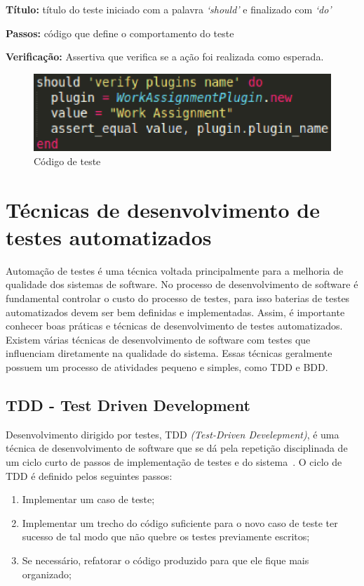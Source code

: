 \textbf{Título:} título do teste iniciado com a palavra \textit{‘should’} e finalizado com \textit{‘do’}

\textbf{Passos:} código que define o comportamento do teste

\textbf{Verificação:} Assertiva que verifica se a ação foi realizada como esperada.

\begin{figure}[!h]
    \centering
    \includegraphics[keepaspectratio=true,scale=0.55]
      {figuras/teste_should.eps}
    \caption{Código de teste}
    \label{noosfero_should}
\end{figure}

\section{Técnicas de desenvolvimento de testes automatizados}

Automação de testes é uma técnica voltada principalmente para a melhoria de 
qualidade dos sistemas de software. 
%
No processo de desenvolvimento de software é fundamental controlar o custo do 
processo de testes, para isso baterias de testes automatizados devem ser bem 
definidas e implementadas. Assim, é importante conhecer boas práticas e técnicas 
de desenvolvimento de testes automatizados.    
%
Existem várias técnicas de desenvolvimento de software com testes que influenciam 
diretamente na qualidade do sistema. Essas técnicas geralmente possuem um processo 
de atividades pequeno e simples, como TDD e BDD.

\subsection{TDD - Test Driven Development}

Desenvolvimento dirigido por testes, TDD \textit{(Test-Driven Develepment)}, 
é uma técnica de desenvolvimento de software que se dá pela repetição disciplinada 
de um ciclo curto de passos de implementação de testes e do sistema~\cite{koskela2007}.
%
O ciclo de TDD é definido pelos seguintes passos:
%
\begin{enumerate}
\item Implementar um caso de teste;
\item Implementar um trecho do código suficiente para o novo caso de teste ter sucesso 
de tal modo que não quebre os testes previamente escritos;
\item Se necessário, refatorar o código produzido para que ele fique mais organizado;
\end{enumerate}


